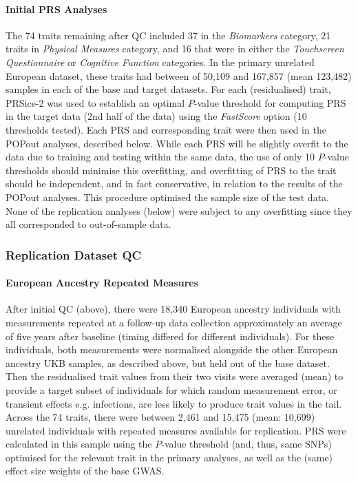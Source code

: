 \documentclass[12pt]{zHenriquesLab-StyleBioRxiv}
\begin{document}
{{\paragraph*{Initial PRS Analyses}
The 74 traits remaining after QC included 37 in the \textit{Biomarkers} category, 
21 traits in \textit{Physical Measures} category, and 16 that were in either 
the \textit{Touchscreen Questionnaire} or \textit{Cognitive Function} categories.  
In the primary unrelated European dataset, these traits had between of 50,109 and 167,857 
(mean 123,482) samples in each of the base and target datasets. For each (residualised) trait, 
PRSice-2 \cite{prsice} was used to establish an optimal $P$-value threshold for computing PRS in 
the target data (2nd half of the data) using the \textit{FastScore} option (10 thresholds tested). 
Each PRS and corresponding trait were then used in the POPout analyses, described below. 
While each PRS will be slightly overfit to the data due to training and testing within the same data, 
the use of only 10 $P$-value thresholds should minimise this overfitting, and overfitting of PRS 
to the trait should be independent, and in fact conservative, in relation to the results of 
the POPout analyses. This procedure optimised the sample size of the test data. None of the replication 
analyses (below) were subject to any overfitting since they all corresponded to out-of-sample data. 
%
\subsubsection*{Replication Dataset QC} \label{sec:methods:rqc} 
\paragraph*{European Ancestry Repeated Measures}
After initial QC (above), there were 18,340 European ancestry individuals 
with measurements repeated at a follow-up data collection approximately an average
of five years after baseline (timing differed for different individuals). For these individuals, both measurements were normalised alongside 
the other European ancestry UKB samples, as described above, but held out of the base dataset. Then 
the residualised trait values from their two visits were averaged (mean) to provide a 
target subset of individuals for which random measurement error, or transient 
effects e.g. infections, are less likely to produce trait values in the tail. 
Across the 74 traits, there were between 2,461 and 15,475 (mean: 10,699) unrelated 
individuals with repeated measures available for replication.  PRS were calculated in this sample 
using the $P$-value threshold (and, thus, same SNPs) optimised for the relevant 
trait in the primary analyses, as well as the (same) effect size weights of the base GWAS. 

}}
\end{document}
